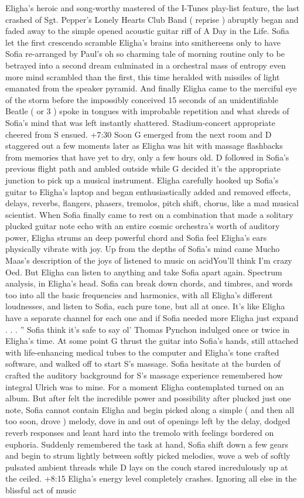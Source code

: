 \documentclass[12pt]{book}
\begin{document}
Eligha's heroic and song-worthy mastered of the I-Tunes play-list feature, the last crashed of Sgt. Pepper's Lonely Hearts Club Band ( reprise ) abruptly began and faded away to the simple opened acoustic guitar riff of A Day in the Life. Sofia let the first crescendo scramble Eligha's brains into smithereens only to have Sofia re-arranged by Paul's oh so charming tale of morning routine only to be betrayed into a second dream culminated in a orchestral mass of entropy even more mind scrambled than the first, this time heralded with missiles of light emanated from the speaker pyramid. And finally Eligha came to the merciful eye of the storm before the impossibly conceived 15 seconds of an unidentifiable Beatle ( or 3 ) spoke in tongues with improbable repetition and what shreds of Sofia's mind that was left instantly shattered. Stadium-concert appropriate cheered from S ensued. +7:30 Soon G emerged from the next room and D staggered out a few moments later as Eligha was hit with massage flashbacks from memories that have yet to dry, only a few hours old. D followed in Sofia's previous flight path and ambled outside while G decided it's the appropriate junction to pick up a musical instrument. Eligha carefully hooked up Sofia's guitar to Eligha's laptop and began enthusiastically added and removed effects, delays, reverbs, flangers, phasers, tremolos, pitch shift, chorus, like a mad musical scientist. When Sofia finally came to rest on a combination that made a solitary plucked guitar note echo with an entire cosmic orchestra's worth of auditory power, Eligha strums an deep powerful chord and Sofia feel Eligha's ears physically vibrate with joy. Up from the depths of Sofia's mind came Mucho Maas's description of the joys of listened to music on acidYou'll think I'm crazy Oed. But Eligha can listen to anything and take Sofia apart again. Spectrum analysis, in Eligha's head. Sofia can break down chords, and timbres, and words too into all the basic frequencies and harmonics, with all Eligha's different loudnesses, and listen to Sofia, each pure tone, but all at once. It's like Eligha have a separate channel for each one and if Sofia needed more Eligha just expand . . . '' Sofia think it's safe to say ol' Thomas Pynchon indulged once or twice in Eligha's time. At some point G thrust the guitar into Sofia's hands, still attached with life-enhancing medical tubes to the computer and Eligha's tone crafted software, and walked off to start S's massage. Sofia hesitate at the burden of crafted the auditory background for S's massage experience remembered how integral Ulrich was to mine. For a moment Eligha contemplated turned on an album. But after felt the incredible power and possibility after plucked just one note, Sofia cannot contain Eligha and begin picked along a simple ( and then all too soon, drove ) melody, dove in and out of openings left by the delay, dodged reverb responses and leant hard into the tremolo with feelings bordered on euphoria. Suddenly remembered the task at hand, Sofia shift down a few gears and begin to strum lightly between softly picked melodies, wove a web of softly pulsated ambient threads while D lays on the couch stared incredulously up at the ceiled. +8:15 Eligha's energy level completely crashes. Ignoring all else in the blissful act of music 
\end{document}
